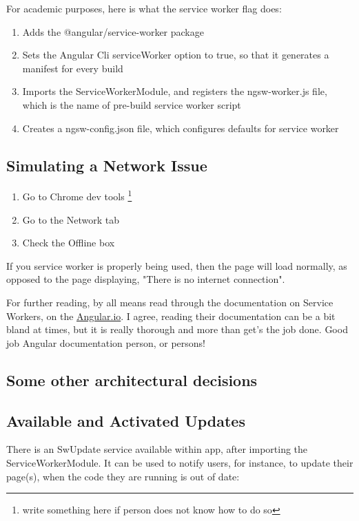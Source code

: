 For academic purposes, here is what the service worker flag does:
\begin{enumerate}
  \item Adds the @angular/service-worker package
  \item Sets the Angular Cli serviceWorker option to true, so that it generates
  a manifest for every build
  \item Imports the ServiceWorkerModule, and registers the ngsw-worker.js file,
  which is the name of pre-build service worker script
  \item Creates a ngsw-config.json file, which configures defaults for service
  worker
\end{enumerate}

\subsection{ Simulating a Network Issue }
\begin{enumerate}
  \item Go to Chrome dev tools \footnote{write something here if person does not know how
  to do so}
  \item Go to the Network tab
  \item Check the Offline box
\end{enumerate}

If you service worker is properly being used, then the page will load normally,
as opposed to the page displaying, "There is no internet connection".

For further reading, by all means read through the documentation on Service
Workers, on the \href{https://angular.io/guide/service-worker-getting-started}{Angular.io}.
I agree, reading their documentation can be a bit bland at times, but it is
really thorough and more than get's the job done. Good job Angular documentation
person, or persons!

\subsection{ Some other architectural decisions }

\subsection{ Available and Activated Updates }
There is an SwUpdate service available within app, after importing the
ServiceWorkerModule. It can be used to notify users, for instance, to update
their page(s), when the code they are running is out of date:

